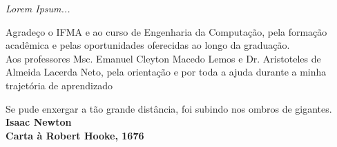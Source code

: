 
\newpage
\vspace*{\fill}
\begin{flushright}
		\textit{Lorem Ipsum...}
\end{flushright}

\begin{agradecimentos}

\vspace*{\fill}
	\begin{flushright}
		Agradeço o IFMA e ao curso de Engenharia da Computação, pela formação acadêmica e pelas oportunidades oferecidas ao longo da graduação.\\
		Aos professores Msc. Emanuel Cleyton Macedo Lemos e Dr. Aristoteles de Almeida Lacerda Neto, pela orientação e por toda a ajuda durante a minha trajetória de aprendizado\\
		 \vspace{\baselineskip}
	\end{flushright}

\end{agradecimentos}

\begin{epigrafe}
    \vspace*{\fill}
	\begin{flushright}
		Se pude enxergar a tão grande distância, foi subindo nos ombros de gigantes.\\
		 \vspace{\baselineskip}
		\textbf{Isaac Newton}\\
		\textbf{Carta à Robert Hooke, 1676}
	\end{flushright}
\end{epigrafe}



